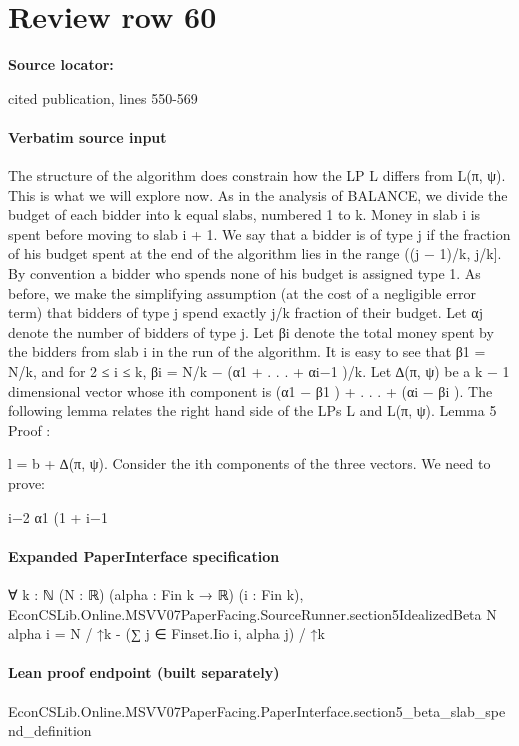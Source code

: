 \documentclass[10pt]{article}
\begin{document}
\section*{Review row 60}
\textbf{Source locator:} {\footnotesize\raggedright cited publication, lines 550-\allowbreak{}569\par}
\paragraph{Verbatim source input}
\begin{ReviewVerbatim}
The structure of the algorithm does constrain how the LP L differs from L(π, ψ). This is what
we will explore now.
As in the analysis of BALANCE, we divide the budget of each bidder into k equal slabs,
numbered 1 to k. Money in slab i is spent before moving to slab i + 1. We say that a bidder
is of type j if the fraction of his budget spent at the end of the algorithm lies in the range
((j − 1)/k, j/k]. By convention a bidder who spends none of his budget is assigned type 1. As
before, we make the simplifying assumption (at the cost of a negligible error term) that bidders
of type j spend exactly j/k fraction of their budget. Let αj denote the number of bidders of
type j. Let βi denote the total money spent by the bidders from slab i in the run of the
algorithm. It is easy to see that β1 = N/k, and for 2 ≤ i ≤ k, βi = N/k − (α1 + . . . + αi−1 )/k.
Let ∆(π, ψ) be a k − 1 dimensional vector whose ith component is (α1 − β1 ) + . . . + (αi − βi ).
The following lemma relates the right hand side of the LPs L and L(π, ψ).
Lemma 5
Proof :

l = b + ∆(π, ψ).
Consider the ith components of the three vectors. We need to prove:

i−2
α1 (1 + i−1
\end{ReviewVerbatim}


\paragraph{Expanded PaperInterface specification}
\begin{ReviewVerbatim}
∀ {k : ℕ} (N : ℝ) (alpha : Fin k → ℝ) (i : Fin k),
  EconCSLib.Online.MSVV07PaperFacing.SourceRunner.section5IdealizedBeta N alpha i =
    N / ↑k - (∑ j ∈ Finset.Iio i, alpha j) / ↑k
\end{ReviewVerbatim}

\paragraph{Lean proof endpoint (built separately)}\begin{ReviewVerbatim}
EconCSLib.Online.MSVV07PaperFacing.PaperInterface.section5_beta_slab_spend_definition
\end{ReviewVerbatim}
\end{document}
